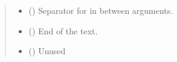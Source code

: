 \documentclass[letterpaper,10pt,english]{sphinxmanual}
\begin{document}
\begin{fulllineitems}
\begin{quote}
\begin{description}
\begin{itemize}
\item {} 
\sphinxAtStartPar
{} (\sphinxstyleliteralemphasis{\sphinxupquote{, }}) \textendash{} Separator for in between arguments.

\item {} 
\sphinxAtStartPar
{} (\sphinxstyleliteralemphasis{\sphinxupquote{, }}) \textendash{} End of the text.

\item {} 
\sphinxAtStartPar
{} () \textendash{} Unused

\end{itemize}

\end{description}\end{quote}

\end{fulllineitems}

\end{document}
